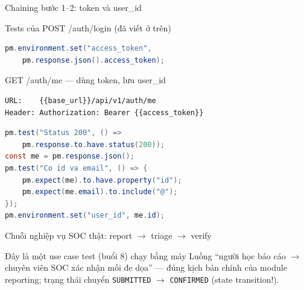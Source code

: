 \documentclass[aspectratio=169,12pt]{beamer}
\begin{document}
\begin{frame}[fragile]{Chaining bước 1--2: token và user\_id}
  \begin{block}{Tests của POST /auth/login (đã viết ở trên)}
\begin{lstlisting}[language=Java]
pm.environment.set("access_token",
    pm.response.json().access_token);
\end{lstlisting}
  \end{block}

  \vspace{-0.5em}
  \begin{block}{GET /auth/me --- dùng token, lưu user\_id}
\begin{lstlisting}[language={}]
URL:    {{base_url}}/api/v1/auth/me
Header: Authorization: Bearer {{access_token}}
\end{lstlisting}
\begin{lstlisting}[language=Java]
pm.test("Status 200", () =>
    pm.response.to.have.status(200));
const me = pm.response.json();
pm.test("Co id va email", () => {
    pm.expect(me).to.have.property("id");
    pm.expect(me.email).to.include("@");
});
pm.environment.set("user_id", me.id);
\end{lstlisting}
  \end{block}
\end{frame}

\begin{frame}{Chuỗi nghiệp vụ SOC thật: report $\to$ triage $\to$ verify}
  \begin{center}
  \end{center}

  \begin{block}{Đây là một use case test (buổi 8) chạy bằng máy}
    Luồng ``người học báo cáo $\to$ chuyên viên SOC xác nhận mối đe dọa''
    --- đúng kịch bản chính của module reporting; trạng thái chuyển
    \texttt{SUBMITTED} $\to$ \texttt{CONFIRMED} (state transition!).
  \end{block}
\end{frame}
\end{document}
